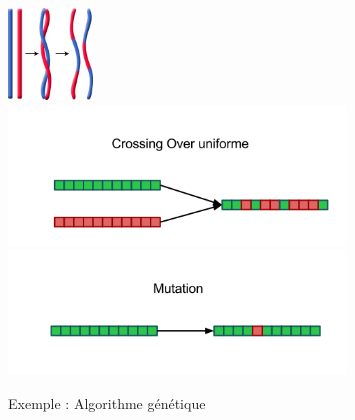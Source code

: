 \begin{figure}[H]
    \centering
    \includegraphics[width=0.2\textwidth]{./pictures/adn.jpg}
    \includegraphics[width=0.8\textwidth]{./pictures/reproduction.png}
    \includegraphics[width=0.8\textwidth]{./pictures/mutation.png}
    
    \caption{Exemple : Algorithme génétique}
\end{figure}

\clearpage
